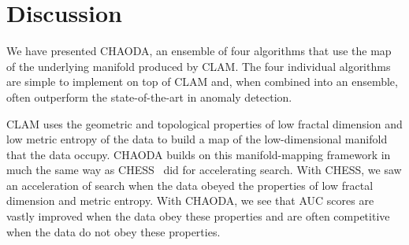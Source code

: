 \section{Discussion}
\label{sec:discussion}

We have presented CHAODA, an ensemble of four algorithms that use the map of the underlying manifold produced by CLAM\@.
The four individual algorithms are simple to implement on top of CLAM and, when combined into an ensemble, often outperform the state-of-the-art in anomaly detection.

CLAM uses the geometric and topological properties of low fractal dimension and low metric entropy of the data to build a map of the low-dimensional manifold that the data occupy.
CHAODA builds on this manifold-mapping framework in much the same way as CHESS~\cite{ishaq2019entropy} did for accelerating search.
With CHESS, we saw an acceleration of search when the data obeyed the properties of low fractal dimension and metric entropy.
With CHAODA, we see that AUC scores are vastly improved when the data obey these properties and are often competitive when the data do not obey these properties.



